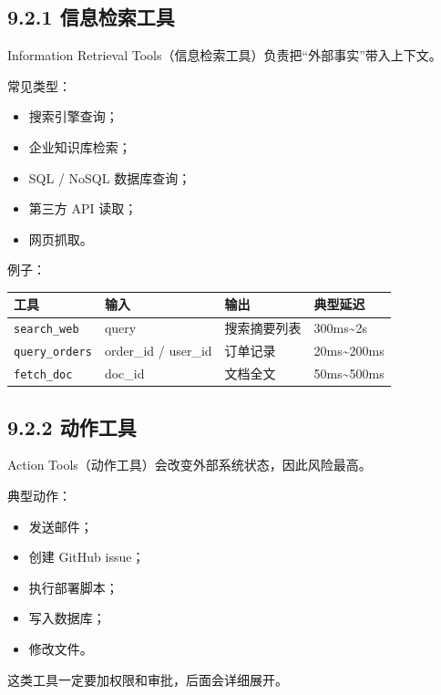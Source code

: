 \subsection{9.2.1 信息检索工具}

Information Retrieval Tools（信息检索工具）负责把``外部事实''带入上下文。


常见类型：


\begin{itemize}[leftmargin=2em]
\item 搜索引擎查询；
\item 企业知识库检索；
\item SQL / NoSQL 数据库查询；
\item 第三方 API 读取；
\item 网页抓取。
\end{itemize}

例子：


\begingroup
\scriptsize
\setlength{\tabcolsep}{3pt}
\begin{longtable}{|p{}|p{}|p{}|p{}|}
\hline
工具 & 输入 & 输出 & 典型延迟 \\ \hline
\texttt{search\_web} & query & 搜索摘要列表 & 300ms\textasciitilde{}2s \\ \hline
\texttt{query\_orders} & order\_id / user\_id & 订单记录 & 20ms\textasciitilde{}200ms \\ \hline
\texttt{fetch\_doc} & doc\_id & 文档全文 & 50ms\textasciitilde{}500ms \\ \hline
\end{longtable}
\endgroup

\subsection{9.2.2 动作工具}

Action Tools（动作工具）会改变外部系统状态，因此风险最高。


典型动作：


\begin{itemize}[leftmargin=2em]
\item 发送邮件；
\item 创建 GitHub issue；
\item 执行部署脚本；
\item 写入数据库；
\item 修改文件。
\end{itemize}

这类工具一定要加权限和审批，后面会详细展开。


